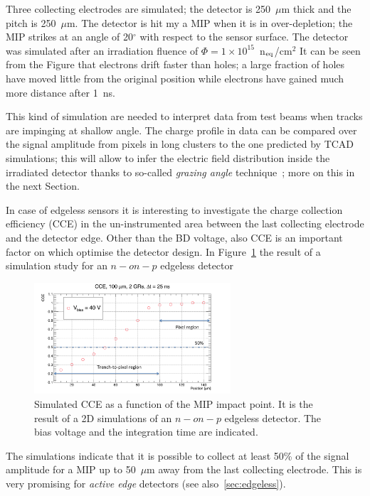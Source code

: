 Three collecting electrodes are simulated; the detector is 250~$\mu$m thick and the pitch 
is 250~$\mu$m. The detector is hit my a MIP when it is in over-depletion; the MIP strikes at 
an angle of 20$^{\circ}$ with respect to the sensor surface. The detector was simulated after 
an irradiation fluence of $\Phi=1\times10^{15}$~n$_{\rm eq}$/cm$^2$
It can be seen from the Figure that electrons drift faster than holes; a large fraction of holes 
have moved little from the original position while electrons have gained much more distance 
after 1~ns. 

This kind of simulation are needed to interpret data from test beams when tracks are impinging 
at shallow angle. The charge profile in data can be compared over the signal amplitude from pixels in 
long clusters to the one predicted by TCAD simulations; this will allow to infer the electric field 
distribution inside the irradiated detector thanks to so-called {\it grazing angle} 
technique~\cite{Henrich:687041,Lari:2001qqa,LARI2004349}; more 
on this in the next Section.

In case of edgeless sensors it is interesting to investigate the charge collection efficiency (CCE) 
in the un-instrumented area between the last collecting electrode and the detector edge. 
Other than the BD voltage, also CCE is an important factor on which optimise the 
detector design. In Figure~\ref{fig:Edgeless_CCE} the result of a simulation study for an 
$n-on-p$ edgeless detector 
\begin{figure}[!htbp]
\centering
\includegraphics[width=0.65\textwidth]{Edgeless_CCE.png}
\caption{\label{fig:Edgeless_CCE}Simulated CCE as a function of the MIP impact point. 
It is the result of a 2D simulations of an $n-on-p$ edgeless detector. The bias voltage and the integration time 
are indicated.}
\end{figure}

The simulations indicate that it is possible to collect at least 50\% of the signal amplitude for a MIP 
up to 50~$\mu$m away from the last collecting electrode. This is very promising for {\it active edge} 
detectors  (see also~\ref{sec:edgeless}).

